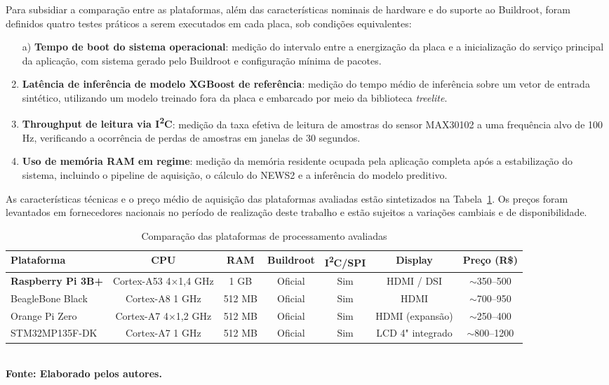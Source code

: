 Para subsidiar a comparação entre as plataformas, além das características 
nominais de hardware e do suporte ao Buildroot, foram definidos quatro 
testes práticos a serem executados em cada placa, sob condições 
equivalentes:

\begin{enumerate}
    \item[a)] \textbf{Tempo de boot do sistema operacional}: medição do 
    intervalo entre a energização da placa e a inicialização do serviço 
    principal da aplicação, com sistema gerado pelo Buildroot e 
    configuração mínima de pacotes.
    
    \item \textbf{Latência de inferência de modelo XGBoost de referência}: 
    medição do tempo médio de inferência sobre um vetor de entrada 
    sintético, utilizando um modelo treinado fora da placa e embarcado por 
    meio da biblioteca \textit{treelite}.
    
    \item \textbf{Throughput de leitura via I\textsuperscript{2}C}: medição 
    da taxa efetiva de leitura de amostras do sensor MAX30102 a uma 
    frequência alvo de 100 Hz, verificando a ocorrência de perdas de 
    amostras em janelas de 30 segundos.
    
    \item \textbf{Uso de memória RAM em regime}: medição da memória 
    residente ocupada pela aplicação completa após a estabilização do 
    sistema, incluindo o pipeline de aquisição, o cálculo do NEWS2 e a 
    inferência do modelo preditivo.
\end{enumerate}

As características técnicas e o preço médio de aquisição das plataformas 
avaliadas estão sintetizados na Tabela~\ref{tableComparativoPlataformas}. 
Os preços foram levantados em fornecedores nacionais no período de 
realização deste trabalho e estão sujeitos a variações cambiais e de 
disponibilidade.

\begin{table}[H]
\centering
\caption{Comparação das plataformas de processamento avaliadas}
\label{tableComparativoPlataformas}
\footnotesize
\begin{tabular}{|l|c|c|c|c|c|c|}
\hline
\textbf{Plataforma} &
\textbf{CPU} &
\textbf{RAM} &
\textbf{Buildroot} &
\textbf{I\textsuperscript{2}C/SPI} &
\textbf{Display} &
\textbf{Preço (R\$)} \\
\hline
\textbf{Raspberry Pi 3B+} &
Cortex-A53 4$\times$1,4 GHz &
1 GB &
Oficial &
Sim &
HDMI / DSI &
$\sim$350--500 \\
\hline
BeagleBone Black &
Cortex-A8 1 GHz &
512 MB &
Oficial &
Sim &
HDMI &
$\sim$700--950 \\
\hline
Orange Pi Zero &
Cortex-A7 4$\times$1,2 GHz &
512 MB &
Oficial &
Sim &
HDMI (expansão) &
$\sim$250--400 \\
\hline
STM32MP135F-DK &
Cortex-A7 1 GHz &
512 MB &
Oficial &
Sim &
LCD 4" integrado &
$\sim$800--1200 \\
\hline
\end{tabular}
{\footnotesize\\ \textbf{Fonte: Elaborado pelos autores.}}
\end{table}

